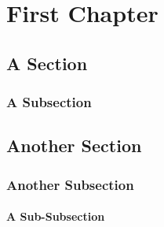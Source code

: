 \chapter{First Chapter}
\section{A Section}
\subsection{A Subsection}
\section{Another Section}
\subsection{Another Subsection}
\subsubsection{A Sub-Subsection}
